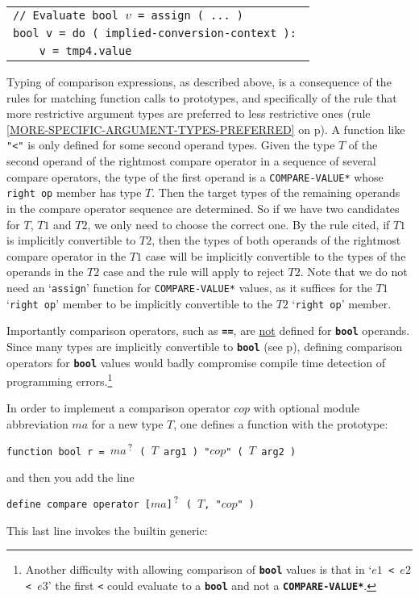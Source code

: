 \documentclass[12pt]{article}
\newcommand{\TT}[1]{{\tt \bfseries #1}}
\newcommand{\pagref}[1]{p\pageref{#1}}
\newcommand{\QMARK}{{$^{\,\mbox{\footnotesize ?}}$}}
\newenvironment{indpar}[1][0.3in]%
	{\begin{list}{}%
		     {\setlength{\itemsep}{0in}%
		      \setlength{\topsep}{0in}%
		      \setlength{\parsep}{1ex}%
		      \setlength{\labelwidth}{#1}%
		      \setlength{\leftmargin}{#1}%
		      \addtolength{\leftmargin}{\labelsep}}%
	 \item}%
	{\end{list}}
\begin{document}
\begin{indpar}
\begin{tabular}{l}
\tt // Evaluate bool $v$ = assign ( ... ) \\
\tt bool v = do ( implied-conversion-context ): \\
\tt ~~~~v = tmp4.value \\
\end{tabular}

\end{indpar}

Typing of comparison expressions, as described above, is a
consequence of the rules for matching function calls to
prototypes, and specifically of the rule that more restrictive
argument types are preferred to less restrictive ones
(rule \ref{MORE-SPECIFIC-ARGUMENT-TYPES-PREFERRED} on
\pagref{MORE-SPECIFIC-ARGUMENT-TYPES-PREFERRED}).
A function like {\tt "<"} is only defined for
some second operand types.  Given the type $T$ of the second operand
of the rightmost compare operator in a sequence of several compare operators,
the type of the first operand is a {\tt *COMPARE-VALUE*}
whose {\tt right op} member has type $T$.  Then the target types
of the remaining operands in the compare operator sequence are determined.
So if we have two candidates
for $T$, $T1$ and $T2$, we only need to choose the correct one.
By the rule cited, if $T1$ is implicitly convertible to $T2$, then
the types of both operands of the rightmost compare operator
in the $T1$ case will be
implicitly convertible to the types of the operands in the $T2$ case
and the rule will apply to reject $T2$.  Note that we do not need
an `{\tt assign}' function for {\tt *COMPARE-VALUE*}
values, as it suffices for the $T1$ `{\tt right op}' member to be
implicitly convertible to the $T2$ `{\tt right op}' member.

Importantly comparison operators, such as \TT{==}, are
\underline{not} defined for \TT{bool} operands.  Since many
types are implicitly convertible to \TT{bool}
(see \pagref{IMPLIED-BOOL-CONVERSION}), defining comparison
operators for \TT{bool} values would badly compromise compile time
detection of programming errors.\footnote{Another difficulty
with allowing comparison of \TT{bool} values is that in
`{\tt $e1$ < $e2$ < $e3$}' the first {\tt <} could evaluate
to a \TT{bool} and not a \TT{*COMPARE-VALUE*}.}

In order to implement a comparison operator $cop$ with optional
module abbreviation $ma$ for a new
type $T$, one defines a function with the prototype:
\begin{center}
\tt function bool r = $ma$\QMARK{} ( $T$ arg1 ) "$cop$" ( $T$ arg2 )
\end{center}
and then you add the line
\begin{center}
\tt define compare operator [$ma$]\QMARK{} ( $T$, "$cop$" )
\end{center}
This last line invokes the builtin generic:
\end{document}
